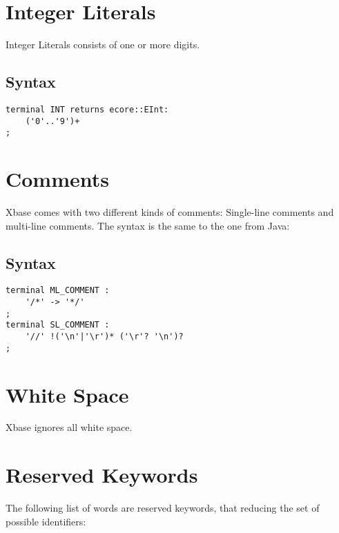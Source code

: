 \documentclass[a4paper,10pt]{scrreprt}
\begin{document}
\section{Integer Literals}
\label{IntegerLiterals}
Integer Literals consists of one or more digits.

\subsection{Syntax}

\begin{lstlisting}
terminal INT returns ecore::EInt: 
	('0'..'9')+
;

\end{lstlisting}







\section{Comments}
\label{Comments}
Xbase comes with two different kinds of comments: Single-line comments and multi-line comments.
The syntax is the same to the one from Java:

\subsection{Syntax}

\begin{lstlisting}
terminal ML_COMMENT	: 
	'/*' -> '*/'
;
terminal SL_COMMENT : 
	'//' !('\n'|'\r')* ('\r'? '\n')?
;

\end{lstlisting}







\section{White Space}
\label{Whitespace}
Xbase ignores all white space.




\section{Reserved Keywords}
\label{Keywords}
The following list of words are reserved keywords, that reducing the set of possible identifiers:
\end{document}
